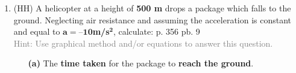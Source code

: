 \documentclass[A4,12pt]{article}
\begin{document}
\begin{enumerate}[label=\bfseries (\arabic*)]
\item (HH) A helicopter at a height of \textbf{500 m} drops a package which falls to the ground. Neglecting air resistance and assuming the acceleration is constant and equal to $\bm{a = –10 }$\textbf{m/s}$\bm{^2}$, calculate: \cite{CCEADA} p. 356 pb. 9\\
\textcolor{gray}{Hint: Use graphical method and/or equations to answer this question.}
%
\begin{itemize}
    \item[\bf (a)] The \textbf{time taken} for the package to \textbf{reach the ground}.

\end{itemize}
\end{enumerate}
\end{document}
